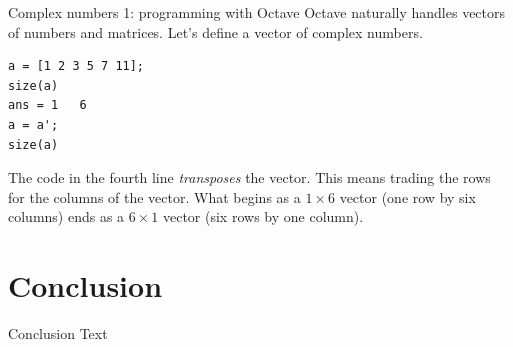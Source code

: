 \documentclass{beamer}
\begin{document}
\begin{frame}[fragile]{Complex numbers 1: programming with Octave}
Octave naturally handles vectors of numbers and matrices.  Let's define a vector of complex numbers. \\
\begin{verbatim}
a = [1 2 3 5 7 11];
size(a)
ans = 1   6
a = a';
size(a)
\end{verbatim}
The code in the fourth line \textit{transposes} the vector.  This means trading the rows for the columns of the vector.  What begins as a $1 \times 6$ vector (one row by six columns) ends as a $6 \times 1$ vector (six rows by one column).
\end{frame}

\section{Conclusion}

\begin{frame}{Conclusion}
Text
\end{frame}
\end{document}

